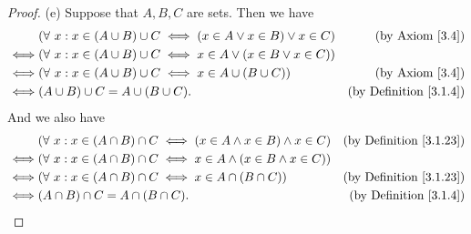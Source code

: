 \begin{proof}{(e)}
Suppose that \(A, B, C\) are sets.
Then we have
\begin{align*}
& (\forall\ x : x \in (A \cup B) \cup C \iff (x \in A \lor x \in B) \lor x \in C) & \text{(by Axiom \ref{3.4})} \\
\iff & (\forall\ x : x \in (A \cup B) \cup C \iff x \in A \lor (x \in B \lor x \in C)) \\
\iff & (\forall\ x : x \in (A \cup B) \cup C \iff x \in A \cup (B \cup C)) & \text{(by Axiom \ref{3.4})} \\
\iff & (A \cup B) \cup C = A \cup (B \cup C). & \text{(by Definition \ref{3.1.4})}
\end{align*}
And we also have
\begin{align*}
& (\forall\ x : x \in (A \cap B) \cap C \iff (x \in A \land x \in B) \land x \in C) & \text{(by Definition \ref{3.1.23})} \\
\iff & (\forall\ x : x \in (A \cap B) \cap C \iff x \in A \land (x \in B \land x \in C)) \\
\iff & (\forall\ x : x \in (A \cap B) \cap C \iff x \in A \cap (B \cap C)) & \text{(by Definition \ref{3.1.23})} \\
\iff & (A \cap B) \cap C = A \cap (B \cap C). & \text{(by Definition \ref{3.1.4})}
\end{align*}
\end{proof}

